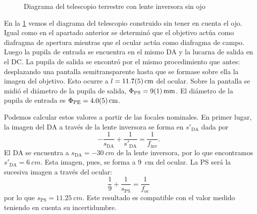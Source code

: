 \documentclass[12pt]{article}
\numberwithin{table}{section}
\numberwithin{figure}{section}
\numberwithin{equation}{section}
\newcommand{\data}[3]{\SI{#1 \pm #2}{#3}}
\begin{document}
\begin{figure}[htb]

	\caption{Diagrama del telescopio terrestre con lente inversora sin ojo}
	\label{fig:telescopio terrestre}
\end{figure}

En la \cref{fig:telescopio terrestre} vemos el diagrama del telescopio construido sin tener en cuenta el ojo. Igual como en el apartado anterior se determinó que el objetivo actúa como diafragma de apertura mientras que el ocular actúa como diafragma de campo. Luego la pupila de entrada se encuentra en el mismo DA y la lucarna de salida en el DC. La pupila de salida se encontró por el mismo procedimiento que antes: desplazando una pantalla semitransparente hasta que se formase sobre ella la imagen del objetivo. Esto ocurre a \( l = \data{11.7}{0.5}{cm} \) del ocular. Sobre la pantalla se midió el diámetro de la pupila de salida, \( \Phi_\text{PS} = \data{9}{1}{mm} \). El diámetro de la pupila de entrada es \( \Phi_\text{PE} = \data{4}{0.5}{cm} \).

Podemos calcular estos valores a partir de las focales nominales. En primer lugar, la imagen del DA a través de la lente inversora se forma en \( s'_\text{DA} \) dada por
\begin{equation*}
	-\frac{1}{s_\text{DA}} + \frac{1}{s'_\text{DA}} = \frac{1}{f_\text{inv}}.
\end{equation*}
El DA se encuentra a \( s_\text{DA} = \SI{-30}{cm} \) de la lente inversora, por lo que encontramos \( s'_\text{DA} = \SI{6}{cm} \). Esta imagen, pues, se forma a \SI{9}{cm} del ocular. La PS será la sucesiva imagen a través del ocular:
\begin{equation*}
	\frac{1}{9} + \frac{1}{s_\text{PS}} = \frac{1}{f_\text{oc}}
\end{equation*}
por lo que \( s_\text{PS} = \SI{11.25}{cm} \). Este resultado es compatible con el valor medido teniendo en cuenta su incertidumbre. 
\end{document}
